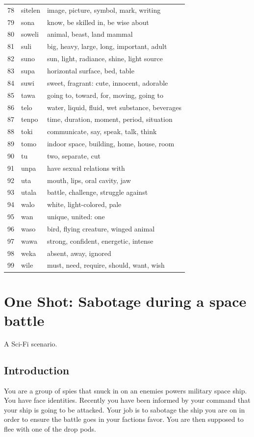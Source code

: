 \documentclass[11pt]{article}
\begin{document}
{\begin{multicols}{2}[]
\begin{center}
\begin{tabularx}{\linewidth}{rlX}
78 & sitelen & image, picture, symbol, mark, writing\\
79 & sona & know, be skilled in, be wise about\\
80 & soweli & animal, beast, land mammal\\
81 & suli & big, heavy, large, long, important, adult\\
82 & suno & sun, light, radiance, shine, light source\\
83 & supa & horizontal surface, bed, table\\
84 & suwi & sweet, fragrant: cute, innocent, adorable\\
85 & tawa & going to, toward, for, moving, going to\\
86 & telo & water, liquid, fluid, wet substance, beverages\\
87 & tenpo & time, duration, moment, period, situation\\
88 & toki & communicate, say, speak, talk, think\\
89 & tomo & indoor space, building, home, house, room\\
90 & tu & two, separate, cut\\
91 & unpa & have sexual relations with\\
92 & uta & mouth, lips, oral cavity, jaw\\
93 & utala & battle, challenge, struggle against\\
94 & walo & white, light-colored, pale\\
95 & wan & unique, united: one\\
96 & waso & bird, flying creature, winged animal\\
97 & wawa & strong, confident, energetic, intense\\
98 & weka & absent, away, ignored\\
99 & wile & must, need, require, should, want, wish\\
\end{tabularx}
\end{center}
\end{multicols}
\normalsize
\section{One Shot: Sabotage during a space battle}
\label{sec:org49b7a6d}

A Sci-Fi scenario.
\subsection{Introduction}
\label{sec:org0802dcb}
You are a group of spies that snuck in on an enemies powers military space ship. You have face identities. Recently you have been informed by your command that your ship is going to be attacked. Your job is to sabotage the ship you are on in order to ensure the battle goes in your factions favor. You are then supposed to flee with one of the drop pods.
}
\end{document}
